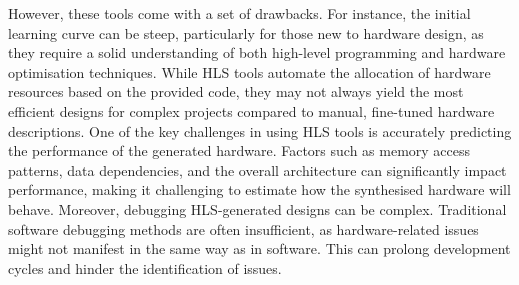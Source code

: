 

However, these tools come with a set of drawbacks. For instance, the initial learning curve can be steep, particularly for those new to hardware design, as they require a solid understanding of both high-level programming and hardware optimisation techniques. While HLS tools automate the allocation of hardware resources based on the provided code, they may not always yield the most efficient designs for complex projects compared to manual, fine-tuned hardware descriptions. One of the key challenges in using HLS tools is accurately predicting the performance of the generated hardware. Factors such as memory access patterns, data dependencies, and the overall architecture can significantly impact performance, making it challenging to estimate how the synthesised hardware will behave. Moreover, debugging HLS-generated designs can be complex. Traditional software debugging methods are often insufficient, as hardware-related issues might not manifest in the same way as in software. This can prolong development cycles and hinder the identification of issues.

